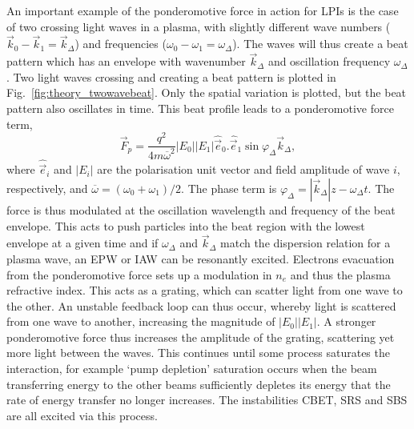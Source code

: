 An important example of the ponderomotive force in action for \ac{LPIs} is the case of two crossing light waves in a plasma, with slightly different wave numbers ($\vec{k}_0-\vec{k}_1 = \vec{k}_\Delta$) and frequencies ($\omega_0-\omega_1 = \omega_\Delta$).
The waves will thus create a beat pattern which has an envelope with wavenumber $\vec{k}_\Delta$ and oscillation frequency $\omega_\Delta$.
Two light waves crossing and creating a beat pattern is plotted in Fig.~\ref{fig:theory_twowavebeat}.
Only the spatial variation is plotted, but the beat pattern also oscillates in time.
This beat profile  leads to a ponderomotive force term,
\begin{equation}
    \vec{F}_p = \frac{q^2}{4 m \overline{\omega}^2}|E_0| |E_1| \hat{\vec{e}}_0 . \hat{\vec{e}}_1 \sin{\varphi_\Delta}\vec{k}_\Delta,
\end{equation}
where $\hat{\vec{e}}_i$ and $|E_i|$ are the polarisation unit vector and field amplitude of wave $i$, respectively, and $\overline{\omega} = (\omega_0 + \omega_1)/2$.
The phase term is $\varphi_\Delta = |\vec{k}_\Delta|z - \omega_\Delta t$.
The force is thus modulated at the oscillation wavelength and frequency of the beat envelope.
This acts to push particles into the beat region with the lowest envelope at a given time and if $\omega_\Delta$ and $\vec{k}_\Delta$ match the dispersion relation for a plasma wave, an \ac{EPW} or \ac{IAW} can be resonantly excited.
Electrons evacuation from the ponderomotive force sets up a modulation in $n_e$ and thus the plasma refractive index.
This acts as a grating, which can scatter light from one wave to the other.
An unstable feedback loop can thus occur, whereby light is scattered from one wave to another, increasing the magnitude of $|E_0| |E_1|$.
A stronger ponderomotive force thus increases the amplitude of the grating, scattering yet more light between the waves.
This continues until some process saturates the interaction, for example `pump depletion' saturation occurs when the beam transferring energy to the other beams sufficiently depletes its energy that the rate of energy transfer no longer increases.
The instabilities \ac{CBET}, \ac{SRS} and \ac{SBS} are all excited via this process.

